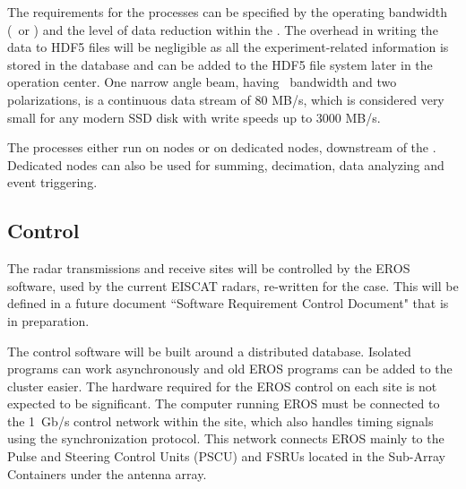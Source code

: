 \documentclass[12pt,a4paper]{article}
\begin{document}
The requirements for the \FW processes can be specified by the operating bandwidth (\NBW\ or \WBW) and the level of data reduction within the \SBF. 
The overhead in writing the data to HDF5 files will be negligible as all the experiment-related information is stored in the database and can be added to the HDF5 file system later in the operation center. One narrow angle beam, having \NBW\ bandwidth and two polarizations, is a continuous data stream of 80 MB/s, which is considered very small for any modern SSD disk with write speeds up to 3000 MB/s.  

The \FW processes either run on \SBF nodes or on dedicated nodes, downstream of the \SBF. Dedicated nodes can also be used for summing, decimation, data analyzing and event triggering. 



\subsection{Control}
\label{sec:control}

The \ED radar transmissions and receive sites will be controlled by the EROS~\cite{eros} software, used by the current EISCAT radars, re-written for the \ED case.
This will be defined in a future document ``\ED Software Requirement Control Document" that is in preparation.

The control software will be built around a distributed database. 
Isolated programs can work asynchronously and old EROS programs can be added to the cluster easier.  
The hardware required for the EROS control on each site is not expected to be significant.  %
The computer running EROS must be connected to the 1~Gb/s control network within the site, which also handles timing signals using the \WR synchronization protocol.
This network connects EROS mainly to the Pulse and Steering Control Units (PSCU) and FSRUs located in the Sub-Array Containers under the antenna array. %
\end{document}
